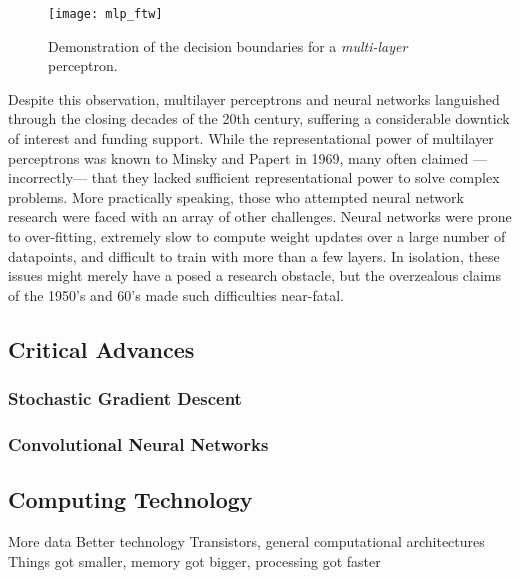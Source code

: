 \begin{figure}
\begin{centering}
\texttt{[image: mlp\_ftw]}
\caption{Demonstration of the decision boundaries for a \emph{multi-layer} perceptron.}
\label{fig:mlp_ftw}
\end{centering}
\end{figure}

Despite this observation, multilayer perceptrons and neural networks languished through the closing decades of the 20th century, suffering a considerable downtick of interest and funding support.
While the representational power of multilayer perceptrons was known to Minsky and Papert in 1969, many often claimed ---incorrectly--- that they lacked sufficient representational power to solve complex problems.
More practically speaking, those who attempted neural network research were faced with an array of other challenges.
Neural networks were prone to over-fitting, extremely slow to compute weight updates over a large number of datapoints, and difficult to train with more than a few layers.
In isolation, these issues might merely have a posed a research obstacle, but the overzealous claims of the 1950's and 60's made such difficulties near-fatal.


\subsection{Critical Advances}
\label{sec:advances}


\subsubsection{Stochastic Gradient Descent}
\label{subsec:perceptrons}


\subsubsection{Convolutional Neural Networks}
\label{subsec:convnets}


\subsection{Computing Technology}
\label{subsec:hardware}
More data
Better technology
Transistors, general computational architectures
Things got smaller, memory got bigger, processing got faster


